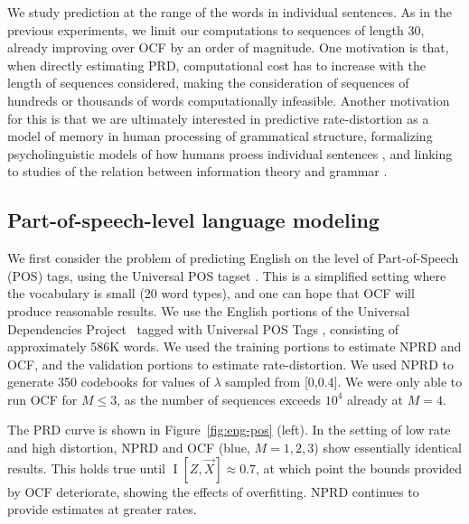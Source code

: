 \documentclass[entropy,article,submit,moreauthors,pdftex,10pt,a4paper]{Definitions/mdpi}
\newcommand{\future}{\overrightarrow{X}}
\begin{document}

We study prediction at the range of the words in individual sentences.
As in the previous experiments, we limit our computations to sequences of length 30, already improving over OCF by an order of magnitude.
One motivation is that, when directly estimating PRD, computational cost has to increase with the length of sequences considered, making the consideration of sequences of hundreds or thousands of words computationally infeasible.
Another motivation for this is that we are ultimately interested in predictive rate-distortion as a model of memory in human processing of grammatical structure, formalizing psycholinguistic models of how humans proess individual sentences \citep{gibson-linguistic-1998,futrell-noisy-context-2017}, and linking to studies of the relation between information theory and grammar \citep{koplenig2017statistical}.





\subsection{Part-of-speech-level language modeling}\label{sec:pos}

We first consider the problem of predicting English on the level of Part-of-Speech (POS) tags, using the Universal POS tagset \citep{petrov-universal-2012}. 
This is a simplified setting where the vocabulary is small (20 word types), and one can hope that OCF will produce reasonable results.
We use the English portions of the Universal Dependencies Project~\citep{nivre-universal-2017} tagged with Universal POS Tags \citep{petrov-universal-2012}, consisting of approximately 586K words.
We used the training portions to estimate NPRD and OCF, and the validation portions to estimate rate-distortion.
We used NPRD to generate 350 codebooks for values of $\lambda$ sampled from [0,0.4].
We were only able to run OCF for $M \leq 3$, as the number of sequences exceeds $10^4$ already at $M=4$.


The PRD curve is shown in Figure~\ref{fig:eng-pos} (left).
In the setting of low rate and high distortion, NPRD and OCF (blue, $M=1,2,3$) show essentially identical results.
This holds true until $\operatorname{I}[Z, \future] \approx 0.7$, at which point the bounds provided by OCF deteriorate, showing the effects of overfitting.
NPRD continues to provide estimates at greater rates.
\end{document}
